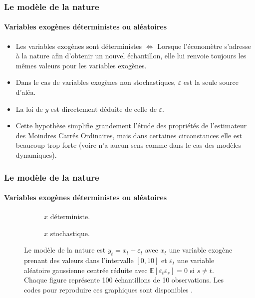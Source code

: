 \documentclass[10pt]{beamer}
\begin{document}
\begin{frame}
  \frametitle{Le modèle de la nature}
  \framesubtitle{Variables exogènes déterministes ou aléatoires}

  \begin{itemize}

  \item Les variables exogènes sont déterministes $\Leftrightarrow$
    Lorsque l'économètre s'adresse à la nature afin d'obtenir un
    nouvel échantillon, elle lui renvoie toujours les mêmes valeurs
    pour les variables exogènes.\newline

  \item Dans le cas de variables exogènes non
    stochastiques, $\varepsilon$ est la seule source d'aléa.\newline

  \item[$\Rightarrow$] La loi de $y$ est directement déduite de celle de $\varepsilon$.\newline

  \item Cette hypothèse simplifie grandement l'étude des propriétés de
    l'estimateur des Moindres Carrés Ordinaires, mais dans certaines
    circonstances elle est beaucoup trop forte (voire n'a aucun sens
    comme dans le cas des modèles dynamiques).\newline

  \end{itemize}

\end{frame}


\begin{frame}
  \frametitle{Le modèle de la nature}
  \framesubtitle{Variables exogènes déterministes ou aléatoires}

  \begin{figure}
    \centering
    \begin{subfigure}{0.48\textwidth}
      \scalebox{.3}{
    }
    \caption{$x$ déterministe.}
    \label{fig:01:a}
  \end{subfigure}
  \hfill
  \begin{subfigure}{0.48\textwidth}
    \scalebox{.3}{
    }
    \caption{$x$ stochastique.}
    \label{fig:01:b}
  \end{subfigure}
  \caption{Le modèle de la nature est $y_t = x_t + \varepsilon_t$ avec $x_t$ une variable exogène prenant des valeurs dans l'intervalle $[0,10]$ et $\varepsilon_t$ une variable aléatoire gaussienne centrée réduite avec $\mathbb E[\varepsilon_t\varepsilon_s]=0$ si $s\neq t$. Chaque figure représente 100 échantillons de 10 observations. Les codes pour reproduire ces graphiques sont disponibles .}
  \label{fig:01}
\end{figure}
\end{frame}
\end{document}
